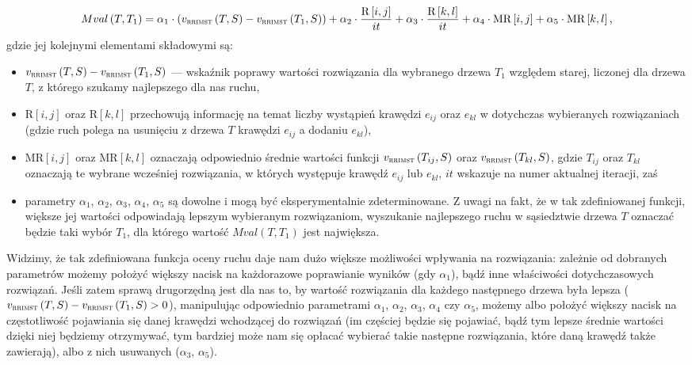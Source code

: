 \begin{equation}
	Mval \left( T, T_{1} \right) = \alpha_{1} \cdot \left( v_{\textsc{rrimst}} \left( T, S \right) - v_{\textsc{rrimst}} \left( T_{1}, S \right) \right) + \alpha_{2} \cdot \frac{\text{R} \left[ i, j \right]}{it} + \alpha_{3} \cdot \frac{\text{R} \left[ k, l \right]}{it} + \alpha_{4} \cdot \text{MR} \left[ i, j \right] + \alpha_{5} \cdot \text{MR} \left[ k, l \right]\text{,}
\end{equation}
gdzie jej kolejnymi elementami składowymi są:
\begin{itemize}
	\item $v_{\textsc{rrimst}} \left( T, S \right) - v_{\textsc{rrimst}} \left( T_{1}, S \right)$ --- wskaźnik poprawy wartości rozwiązania dla wybranego drzewa $T_{1}$ względem starej, liczonej dla drzewa $T$, z którego szukamy najlepszego dla nas ruchu,
	\item $\text{R} \left[ i, j \right]$ oraz $\text{R} \left[ k, l \right]$ przechowują informację na temat liczby wystąpień krawędzi $e_{ij}$ oraz $e_{kl}$ w dotychczas wybieranych rozwiązaniach (gdzie ruch polega na usunięciu z drzewa $T$ krawędzi $e_{ij}$ a dodaniu $e_{kl}$),
	\item $\text{MR} \left[ i, j \right]$ oraz $\text{MR} \left[ k, l \right]$ oznaczają odpowiednio średnie wartości funkcji $v_{\textsc{rrimst}} \left( T_{ij}, S \right)$ oraz $v_{\textsc{rrimst}} \left( T_{kl}, S \right)$, gdzie $T_{ij}$ oraz $T_{kl}$ oznaczają te wybrane wcześniej rozwiązania, w których występuje krawędź $e_{ij}$ lub $e_{kl}$, $it$ wskazuje na numer aktualnej iteracji, zaś
	\item parametry $\alpha_{1}$, $\alpha_{2}$, $\alpha_{3}$, $\alpha_{4}$, $\alpha_{5}$ są dowolne i mogą być eksperymentalnie zdeterminowane. Z uwagi na fakt, że w tak zdefiniowanej funkcji, większe jej wartości odpowiadają lepszym wybieranym rozwiązaniom, wyszukanie najlepszego ruchu w sąsiedztwie drzewa $T$ oznaczać będzie taki wybór $T_{1}$, dla którego wartość $Mval  \left( T, T_{1} \right)$ jest największa.
\end{itemize}

Widzimy, że tak zdefiniowana funkcja oceny ruchu daje nam dużo większe możliwości wpływania na rozwiązania: zależnie od dobranych parametrów możemy położyć większy nacisk na każdorazowe poprawianie wyników (gdy $\alpha_{1}$), bądź inne właściwości dotychczasowych rozwiązań. Jeśli zatem sprawą drugorzędną jest dla nas to, by wartość rozwiązania dla każdego następnego drzewa była lepsza ($v_{\textsc{rrimst}} \left( T, S \right) - v_{\textsc{rrimst}} \left( T_{1}, S \right) > 0$), manipulując odpowiednio parametrami $\alpha_{1}$, $\alpha_{2}$, $\alpha_{3}$, $\alpha_{4}$ czy $\alpha_{5}$, możemy albo położyć większy nacisk na częstotliwość pojawiania się danej krawędzi wchodzącej do rozwiązań (im częściej będzie się pojawiać, bądź tym lepsze średnie wartości dzięki niej będziemy otrzymywać, tym bardziej może nam się opłacać wybierać takie następne rozwiązania, które daną krawędź także zawierają), albo z nich usuwanych ($\alpha_{3}$, $\alpha_{5}$).

